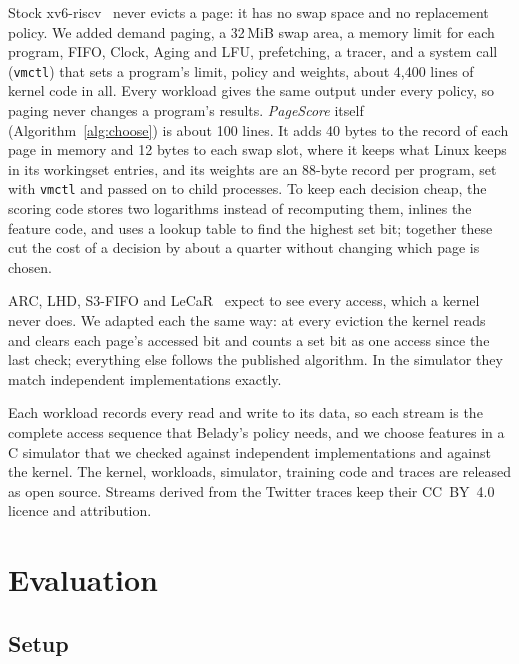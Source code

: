 \documentclass{article}
\newcommand{\xv}{xv6-riscv\xspace}
\newcommand{\clock}{Clock\xspace}
\newcommand{\belady}{Belady\xspace}
\DeclareRobustCommand{\pagescore}{\textit{PageScore}}
\begin{document}
Stock \xv~\citep{xv6} never evicts a page: it has no swap space and no replacement policy. We added demand paging, a 32\,MiB swap area, a memory limit for each program, FIFO, \clock, Aging and LFU, prefetching, a tracer, and a system call (\texttt{vmctl}) that sets a program's limit, policy and weights, about 4,400 lines of kernel code in all. Every workload gives the same output under every policy, so paging never changes a program's results. \pagescore{} itself (Algorithm~\ref{alg:choose}) is about 100 lines. It adds 40 bytes to the record of each page in memory and 12 bytes to each swap slot, where it keeps what Linux keeps in its workingset entries, and its weights are an 88-byte record per program, set with \texttt{vmctl} and passed on to child processes.
To keep each decision cheap, the scoring code stores two logarithms instead of recomputing them, inlines the feature code, and uses a lookup table to find the highest set bit; together these cut the cost of a decision by about a quarter without changing which page is chosen.

ARC, LHD, S3-FIFO and LeCaR~\citep{vietri2018lecar} expect to see every access, which a kernel never does. We adapted each the same way: at every eviction the kernel reads and clears each page's accessed bit and counts a set bit as one access since the last check; everything else follows the published algorithm. In the simulator they match independent implementations exactly.

Each workload records every read and write to its data, so each stream is the complete access sequence that \belady's policy needs, and we choose features in a C simulator that we checked against independent implementations and against the kernel.
The kernel, workloads, simulator, training code and traces are released as open source. Streams derived from the Twitter traces keep their CC~BY~4.0 licence and attribution.

\section{Evaluation}
\label{sec:eval}

\subsection{Setup}
\label{sec:eval-setup}
\end{document}
